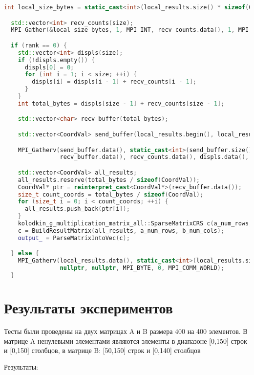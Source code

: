 \documentclass[14pt,a4paper]{extarticle}
\begin{document}
\begin{lstlisting}[language=C++]
  int local_size_bytes = static_cast<int>(local_results.size() * sizeof(CoordVal));

  std::vector<int> recv_counts(size);
  MPI_Gather(&local_size_bytes, 1, MPI_INT, recv_counts.data(), 1, MPI_INT, 0, MPI_COMM_WORLD);

  if (rank == 0) {
    std::vector<int> displs(size);
    if (!displs.empty()) {
      displs[0] = 0;
      for (int i = 1; i < size; ++i) {
        displs[i] = displs[i - 1] + recv_counts[i - 1];
      }
    }
    int total_bytes = displs[size - 1] + recv_counts[size - 1];

    std::vector<char> recv_buffer(total_bytes);

    std::vector<CoordVal> send_buffer(local_results.begin(), local_results.end());

    MPI_Gatherv(send_buffer.data(), static_cast<int>(send_buffer.size() * sizeof(CoordVal)), MPI_BYTE,
                recv_buffer.data(), recv_counts.data(), displs.data(), MPI_BYTE, 0, MPI_COMM_WORLD);

    std::vector<CoordVal> all_results;
    all_results.reserve(total_bytes / sizeof(CoordVal));
    CoordVal* ptr = reinterpret_cast<CoordVal*>(recv_buffer.data());
    size_t count_coords = total_bytes / sizeof(CoordVal);
    for (size_t i = 0; i < count_coords; ++i) {
      all_results.push_back(ptr[i]);
    }
    kolodkin_g_multiplication_matrix_all::SparseMatrixCRS c(a_num_rows, b_num_cols);
    c = BuildResultMatrix(all_results, a_num_rows, b_num_cols);
    output_ = ParseMatrixIntoVec(c);

  } else {
    MPI_Gatherv(local_results.data(), static_cast<int>(local_results.size() * sizeof(CoordVal)), MPI_BYTE, nullptr,
                nullptr, nullptr, MPI_BYTE, 0, MPI_COMM_WORLD);
  }
\end{lstlisting}

\newpage

\section{Результаты экспериментов}

Тесты были проведены на двух матрицах A и B размера 400 на 400 элементов. В матрице A ненулевыми элементами являются элементы в диапазоне [0,150] строк и [0,150] столбцов, в матрице B: [50,150] строк и [0,140] столбцов

Результаты:
\end{document}
